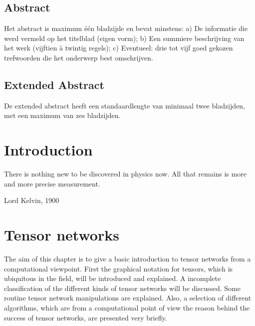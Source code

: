 \documentclass{book}
\newcounter{a}
\newcounter{b}
\begin{document}


\section*{Abstract}

Het abstract is maximum één bladzijde en bevat minstens:
a) De informatie die werd vermeld op het titelblad (eigen vorm);
b) Een summiere beschrijving van het werk (vijftien à twintig regels);
c) Eventueel: drie tot vijf goed gekozen trefwoorden die het onderwerp best
omschrijven.


\section*{Extended Abstract}

De extended abstract heeft een standaardlengte van minimaal twee bladzijden, met een maximum van zes bladzijden.

\tableofcontents


\mainmatter


\chapter{Introduction}

\epigraph{There is nothing new to be discovered in physics now. All that remains is more and more precise measurement.}{Lord Kelvin, 1900}



\chapter{Tensor networks}

The aim of this chapter is to give a basic introduction to tensor networks from a computational viewpoint. First the graphical notation for tensors, which is ubiquitous in the field, will be introduced and explained. A incomplete classification of the different kinds of tensor networks will be discussed. Some routine tensor network manipulations are explained. Also, a selection of different algorithms, which are from a computational point of view the reason behind the success of tensor networks, are presented very briefly.
\end{document}
